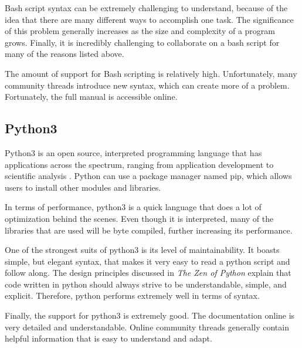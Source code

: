         Bash script syntax can be extremely challenging to understand, because of the idea that there are many different ways to accomplish one task.
        The significance of this problem generally increases as the size and complexity of a program grows.
        Finally, it is incredibly challenging to collaborate on a bash script for many of the reasons listed above.
        
        The amount of support for Bash scripting is relatively high.
        Unfortunately, many community threads introduce new syntax, which can create more of a problem.
        Fortunately, the full manual is accessible online.

    \subsection{Python3}
        
        Python3 is an open source, interpreted programming language that has applications across the spectrum, ranging from application development to scientific analysis \cite{bib:py}. 
        Python can use a package manager named pip, which allows users to install other modules and libraries\cite{bib:pip}.
        
        In terms of performance, python3 is a quick language that does a lot of optimization behind the scenes.
        Even though it is interpreted, many of the libraries that are used will be byte compiled, further increasing its performance.
        
        One of the strongest suits of python3 is its level of maintainability.
        It boasts simple, but elegant syntax, that makes it very easy to read a python script and follow along.
        The design principles discussed in \textit{The Zen of Python} explain that code written in python should always strive to be understandable, simple, and explicit\cite{bib:pep20}.
        Therefore, python performs extremely well in terms of syntax.
        
        Finally, the support for python3 is extremely good.
        The documentation online is very detailed and understandable.
        Online community threads generally contain helpful information that is easy to understand and adapt.
